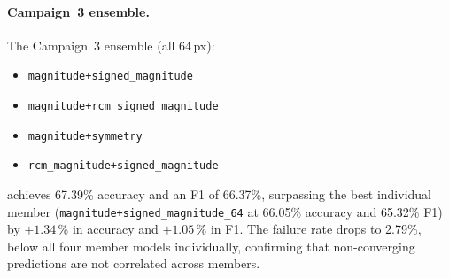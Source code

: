 \begin{table}[H]
  \centering
  \caption{Campaign~5 - Ensemble results: averaging of four independently trained dual-channel models.
           \emph{Campaign~3}: 14 features, 64\,px, no penalty. Members are
           \texttt{mag+signed\_mag}, \texttt{mag+rcm\_signed\_mag},
           \texttt{mag+symmetry}, \texttt{rcm\_mag+signed\_mag}.
           \emph{Campaign~4}: 20 features, 128\,px, $\lambda=1.0$. Members are
           \texttt{mag+log\_density}, \texttt{mag+rcm\_log\_density},
           \texttt{rcm\_mag+rcm\_signed\_mag}, \texttt{symmetry+log\_density}.
           Bold marks the column best.}
  \label{tab:results-campaign5}
\end{table}

\paragraph[Campaign 3 ensemble.]{Campaign~3 ensemble.}

The Campaign~3 ensemble (all 64\,px):
\begin{itemize}
  \item \texttt{magnitude+signed\_magnitude}
  \item \texttt{magnitude+rcm\_signed\_magnitude}
  \item \texttt{magnitude+symmetry}
  \item \texttt{rcm\_magnitude+signed\_magnitude}
\end{itemize}
achieves 67.39\% accuracy and an F1 of 66.37\%, surpassing the best individual member
(\texttt{magnitude+signed\_magnitude\_64} at 66.05\% accuracy and 65.32\% F1)
by $+1.34$\,\% in accuracy and $+1.05$\,\% in F1.
The failure rate drops to 2.79\%, below all four member models individually,
confirming that non-converging predictions are not correlated across members.


